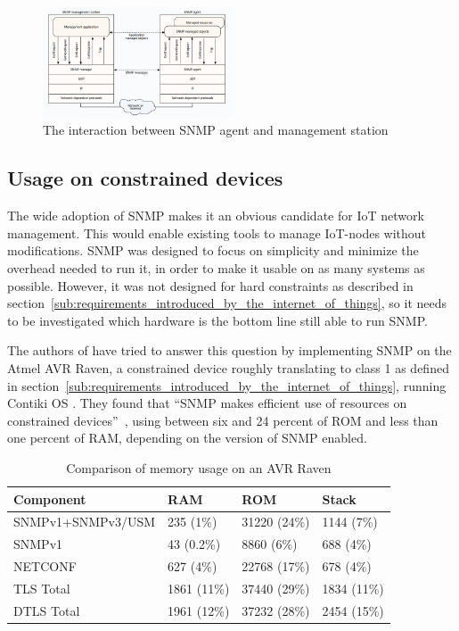 \documentclass[conference]{IEEEtran}
\begin{document}
\begin{figure}[h]
  \begin{center}
    \includegraphics[width=0.5\textwidth]{snmp-arch}
  \end{center}
  \caption{The interaction between SNMP agent and management station\cite{Stallings1998}}
  \label{fig:snmp-arch}
\end{figure}

\subsection{Usage on constrained devices} %
\label{ssub:usage_on_constrained_devices}
The wide adoption of SNMP makes it an obvious candidate for IoT network management. This would enable existing tools to manage IoT-nodes without modifications. SNMP was designed to focus on simplicity and minimize the overhead needed to run it, in order to make it usable on as many systems as possible. However, it was not designed for hard constraints as described in section~\ref{sub:requirements_introduced_by_the_internet_of_things}, so it needs to be investigated which hardware is the bottom line still able to run SNMP.

The authors of \cite{mgmt-constrained-iot} have tried to answer this question by implementing  SNMP on the Atmel AVR Raven, a constrained device roughly translating to class 1 as defined in section~\ref{sub:requirements_introduced_by_the_internet_of_things}, running Contiki OS \cite{Dunkels2004}. They found that ``SNMP makes efficient use of resources on constrained devices''~\cite{mgmt-constrained-iot}, using between six and 24 percent of ROM and less than one percent of RAM, depending on the version of SNMP enabled.

\begin{table}[h]
\begin{tabular}{|l|l|l|l|}
\hline
\textbf{Component} & \textbf{RAM} & \textbf{ROM} & \textbf{Stack} \\ \hline
SNMPv1+SNMPv3/USM  & 235 (1\%)    & 31220 (24\%) & 1144 (7\%)     \\
SNMPv1             & 43 (0.2\%)   & 8860 (6\%)   & 688 (4\%)      \\
NETCONF            & 627 (4\%)    & 22768 (17\%) & 678 (4\%)      \\
TLS Total          & 1861 (11\%)  & 37440 (29\%) & 1834 (11\%)    \\
DTLS Total         & 1961 (12\%)  & 37232 (28\%) & 2454 (15\%)    \\ \hline
\end{tabular}
\label{table:snmp-netconf-constrained-implementation}
\caption{Comparison of memory usage on an AVR Raven\cite{mgmt-constrained-iot}}
\end{table}
\end{document}
